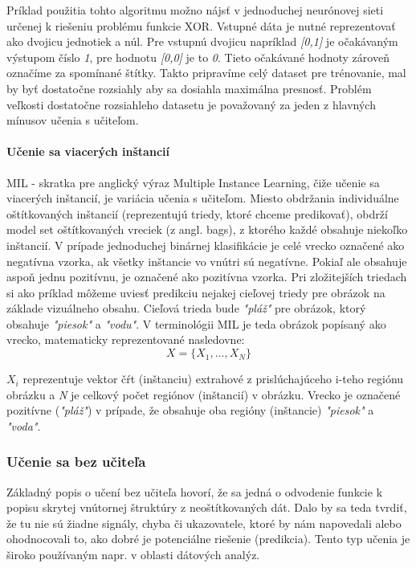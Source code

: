 Príklad použitia tohto algoritmu možno nájsť v jednoduchej neurónovej sieti určenej k riešeniu problému funkcie XOR\cite{neuron}. Vstupné dáta je nutné reprezentovať ako dvojicu jednotiek a núl. Pre vstupnú dvojicu napríklad \textit{[0,1]} je očakávaným výstupom číslo \textit{1}, pre hodnotu \textit{[0,0]} je to \textit{0}. Tieto očakávané hodnoty zároveň označíme za spomínané štítky. Takto pripravíme celý dataset pre trénovanie, mal by byť dostatočne rozsiahly aby sa dosiahla maximálna presnosť. Problém veľkosti dostatočne rozsiahleho datasetu je považovaný za jeden z hlavných mínusov učenia s učiteľom.

	
\paragraph{Učenie sa viacerých inštancií}

MIL\cite{minhas2012multiple} - skratka pre anglický výraz Multiple Instance Learning, čiže učenie sa viacerých inštancií, je variácia učenia s učiteľom. Miesto obdržania individuálne oštítkovaných inštancií (reprezentujú triedy, ktoré chceme predikovať),  obdrží model set oštítkovaných vreciek (z angl. bags), z ktorého každé obsahuje niekoľko inštancií. V prípade jednoduchej binárnej klasifikácie je celé vrecko označené ako negatívna vzorka, ak všetky inštancie vo vnútri sú negatívne. Pokiaľ ale obsahuje aspoň jednu pozitívnu, je označené ako pozitívna vzorka. Pri zložitejších triedach si ako príklad môžeme uviesť predikciu nejakej cieľovej triedy pre obrázok na základe vizuálneho obsahu. Cieľová trieda bude \textit{"pláž"} pre obrázok, ktorý obsahuje  \textit{"piesok"} a \textit{"vodu"}. V terminológii MIL je teda obrázok popísaný ako vrecko, matematicky reprezentované nasledovne:
	\begin{equation}
		X = \{X_1, ..., X_N\}
	\end{equation}

$X_{i}$ reprezentuje vektor čŕt (inštanciu) extrahové z prislúchajúceho i-teho regiónu obrázku a \textit{N} je celkový počet regiónov (inštancií) v obrázku. Vrecko je označené pozitívne  (\textit{"pláž"})  v prípade, že obsahuje oba regióny (inštancie) \textit{"piesok"} a \textit{"voda"}.

\subsubsection{Učenie sa bez učiteľa}
Základný popis o učení bez učiteľa hovorí, že sa jedná o odvodenie funkcie k popisu skrytej vnútornej štruktúry z neoštítkovaných dát. Dalo by sa teda tvrdiť, že tu nie sú žiadne signály, chyba či ukazovatele, ktoré by nám napovedali alebo ohodnocovali to, ako dobré je potenciálne riešenie (predikcia). Tento typ učenia je široko používaným napr. v oblasti dátových analýz.


